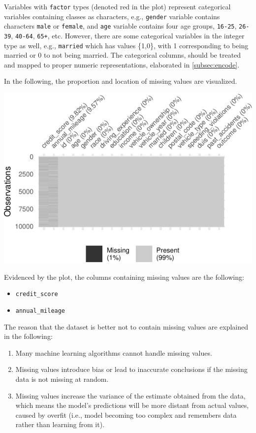 \documentclass{article}
\providecommand{\tightlist}{%
  \setlength{\itemsep}{0pt}\setlength{\parskip}{0pt}}
\begin{document}
Variables with \texttt{factor} types (denoted red in the plot) represent
categorical variables containing classes as characters, e.g.,
\texttt{gender} variable contains characters \texttt{male} or
\texttt{female}, and \texttt{age} variable contains four age groups,
\texttt{16-25}, \texttt{26-39}, \texttt{40-64}, \texttt{65+}, etc.
However, there are some categorical variables in the integer type as
well, e.g., \texttt{married} which has values \{1,0\}, with 1
corresponding to being married or 0 to not being married. The
categorical columns, should be treated and mapped to proper numeric
representations, elaborated in \ref{subsec:encode}.

In the following, the proportion and location of missing values are
visualized.

\begin{center}\includegraphics{report_files/figure-latex/unnamed-chunk-4-1} \end{center}

Evidenced by the plot, the columns containing missing values are the
following:

\begin{itemize}
\tightlist
\item
  \texttt{credit\_score}
\item
  \texttt{annual\_mileage}
\end{itemize}

The reason that the dataset is better not to contain missing values are
explained in the following:

\begin{enumerate}
\def\labelenumi{\arabic{enumi}.}
\tightlist
\item
  Many machine learning algorithms cannot handle missing values.
\item
  Missing values introduce bias or lead to inaccurate conclusions if the
  missing data is not missing at random.
\item
  Missing values increase the variance of the estimate obtained from the
  data, which means the model's predictions will be more distant from
  actual values, caused by overfit (i.e., model becoming too complex and
  remembers data rather than learning from it).
\end{enumerate}
\end{document}
